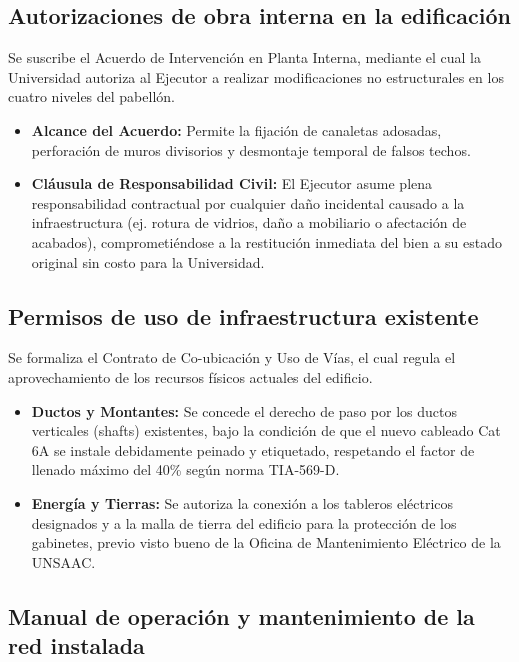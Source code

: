 \subsection*{Autorizaciones de obra interna en la edificación}

Se suscribe el Acuerdo de Intervención en Planta Interna, mediante el cual la Universidad autoriza al Ejecutor a realizar modificaciones no estructurales en los cuatro niveles del pabellón.

\begin{itemize}
    \item \textbf{Alcance del Acuerdo:} Permite la fijación de canaletas adosadas, perforación de muros divisorios y desmontaje temporal de falsos techos.
    \item \textbf{Cláusula de Responsabilidad Civil:} El Ejecutor asume plena responsabilidad contractual por cualquier daño incidental causado a la infraestructura (ej. rotura de vidrios, daño a mobiliario o afectación de acabados), comprometiéndose a la restitución inmediata del bien a su estado original sin costo para la Universidad.
\end{itemize}

\subsection*{Permisos de uso de infraestructura existente}

Se formaliza el Contrato de Co-ubicación y Uso de Vías, el cual regula el aprovechamiento de los recursos físicos actuales del edificio.

\begin{itemize}
    \item \textbf{Ductos y Montantes:} Se concede el derecho de paso por los ductos verticales (shafts) existentes, bajo la condición de que el nuevo cableado Cat 6A se instale debidamente peinado y etiquetado, respetando el factor de llenado máximo del 40\% según norma TIA-569-D.
    \item \textbf{Energía y Tierras:} Se autoriza la conexión a los tableros eléctricos designados y a la malla de tierra del edificio para la protección de los gabinetes, previo visto bueno de la Oficina de Mantenimiento Eléctrico de la UNSAAC.
\end{itemize}

\subsection*{Manual de operación y mantenimiento de la red instalada}

